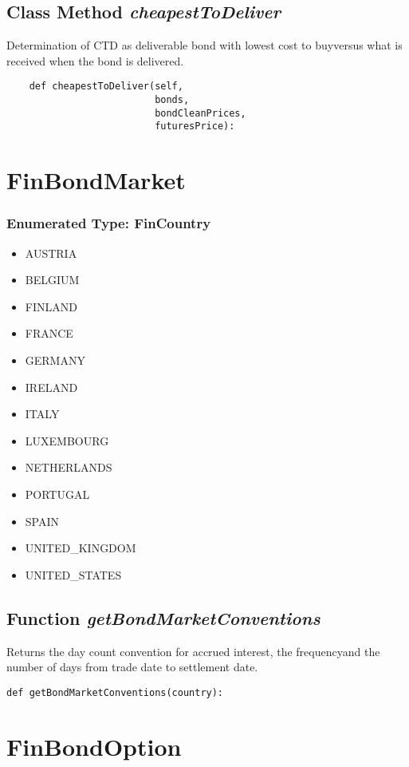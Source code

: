 \documentclass[twoside,11pt]{book}
\begin{document}
\subsection{Class Method {\it cheapestToDeliver}}
Determination of CTD as deliverable bond with lowest cost to buyversus what is received when the bond is delivered. 

\begin{lstlisting}
    def cheapestToDeliver(self,
                          bonds,
                          bondCleanPrices,
                          futuresPrice):
\end{lstlisting}

\newpage
\section{FinBondMarket}

\subsubsection{Enumerated Type: FinCountry}
\begin{itemize}
\item{AUSTRIA}
\item{BELGIUM}
\item{FINLAND}
\item{FRANCE}
\item{GERMANY}
\item{IRELAND}
\item{ITALY}
\item{LUXEMBOURG}
\item{NETHERLANDS}
\item{PORTUGAL}
\item{SPAIN}
\item{UNITED\_KINGDOM}
\item{UNITED\_STATES}
\end{itemize}

\subsection{Function {\it getBondMarketConventions}}
Returns the day count convention for accrued interest, the frequencyand the number of days from trade date to settlement date. 

\begin{lstlisting}
def getBondMarketConventions(country):
\end{lstlisting}

\newpage
\section{FinBondOption}
\end{document}
